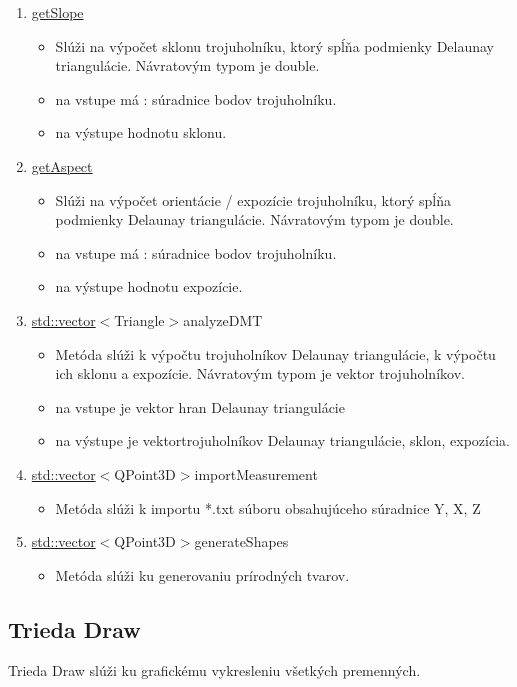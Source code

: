\documentclass[12pt]{article}
\begin{document}
\begin{enumerate}
\item[] \underline{getSlope}
\begin{itemize}
\item Slúži na výpočet sklonu trojuholníku, ktorý spĺňa podmienky Delaunay triangulácie. Návratovým typom je double.
\item na vstupe má : súradnice bodov trojuholníku.
\item na výstupe hodnotu sklonu.
\end{itemize}

\item[] \underline{getAspect}
\begin{itemize}
\item Slúži na výpočet orientácie / expozície trojuholníku, ktorý spĺňa podmienky Delaunay triangulácie. Návratovým typom je double.
\item na vstupe má : súradnice bodov trojuholníku.
\item na výstupe hodnotu expozície.
\end{itemize}

\item[] \underline {std::vector}$<${Triangle}$>${analyzeDMT}
\begin{itemize}
\item Metóda slúži k výpočtu trojuholníkov Delaunay triangulácie, k výpočtu ich sklonu a expozície. Návratovým typom je vektor trojuholníkov.
\item na vstupe je vektor hran Delaunay triangulácie
\item na výstupe je vektortrojuholníkov Delaunay triangulácie, sklon, expozícia.
\end{itemize}

\item[] \underline {std::vector}$<${QPoint3D}$>${importMeasurement}
\begin{itemize}
\item Metóda slúži k importu *.txt súboru obsahujúceho súradnice Y, X, Z 
\end{itemize}

\item[] \underline {std::vector}$<${QPoint3D}$>${generateShapes}
\begin{itemize}
\item Metóda slúži ku generovaniu prírodných tvarov.
\end{itemize}

\end{enumerate}

\subsection{Trieda Draw}
Trieda Draw slúži ku grafickému vykresleniu všetkých premenných.
\end{document}
